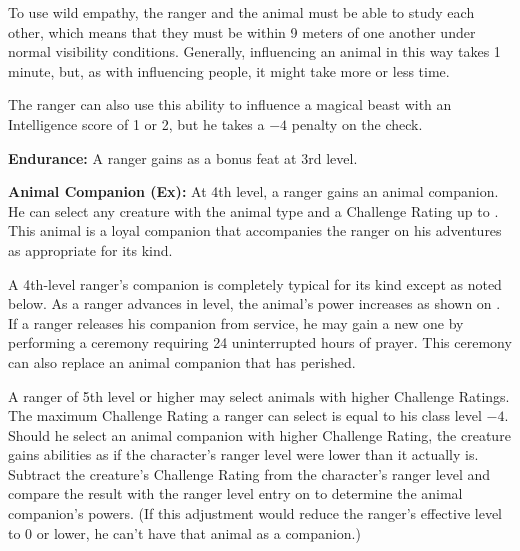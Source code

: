 To use wild empathy, the ranger and the animal must be able to study each other, which means that they must be within 9 meters of one another under normal visibility conditions. Generally, influencing an animal in this way takes 1 minute, but, as with influencing people, it might take more or less time.

The ranger can also use this ability to influence a magical beast with an Intelligence score of 1 or 2, but he takes a $-4$ penalty on the check.


\textbf{Endurance:} A ranger gains  as a bonus feat at 3rd level.


\textbf{Animal Companion (Ex):} At 4th level, a ranger gains an animal companion. He can select any creature with the animal type and a Challenge Rating up to \onehalf. This animal is a loyal companion that accompanies the ranger on his adventures as appropriate for its kind.

A 4th-level ranger's companion is completely typical for its kind except as noted below. As a ranger advances in level, the animal's power increases as shown on . If a ranger releases his companion from service, he may gain a new one by performing a ceremony requiring 24 uninterrupted hours of prayer. This ceremony can also replace an animal companion that has perished.

A ranger of 5th level or higher may select animals with higher Challenge Ratings. The maximum Challenge Rating a ranger can select is equal to his class level $-4$. Should he select an animal companion with higher Challenge Rating, the creature gains abilities as if the character's ranger level were lower than it actually is. Subtract the creature's Challenge Rating from the character's ranger level and compare the result with the ranger level entry on  to determine the animal companion's powers. (If this adjustment would reduce the ranger's effective level to 0 or lower, he can't have that animal as a companion.)


